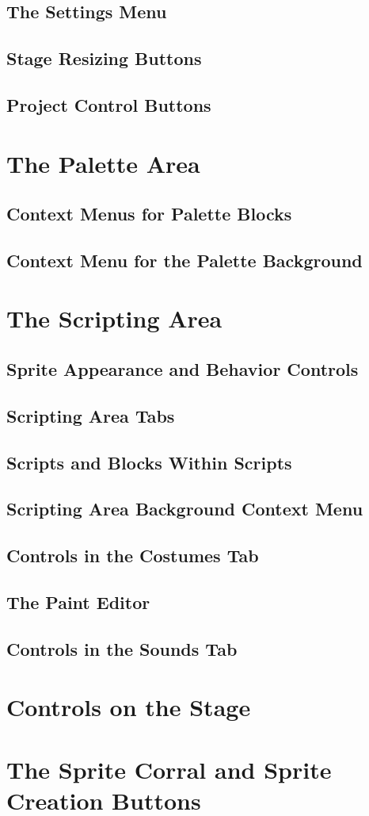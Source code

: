 \documentclass[a4paper]{report}
\begin{document}
\subsection{The Settings Menu}
\subsection{Stage Resizing Buttons}
\subsection{Project Control Buttons}
\section{The Palette Area}
\subsection{Context Menus for Palette Blocks}
\subsection{Context Menu for the Palette Background}
\section{The Scripting Area}
\subsection{Sprite Appearance and Behavior Controls}
\subsection{Scripting Area Tabs}
\subsection{Scripts and Blocks Within Scripts}
\subsection{Scripting Area Background Context Menu}
\subsection{Controls in the Costumes Tab}
\subsection{The Paint Editor}
\subsection{Controls in the Sounds Tab}
\section{Controls on the Stage}
\section{The Sprite Corral and Sprite Creation Buttons}
\end{document}
